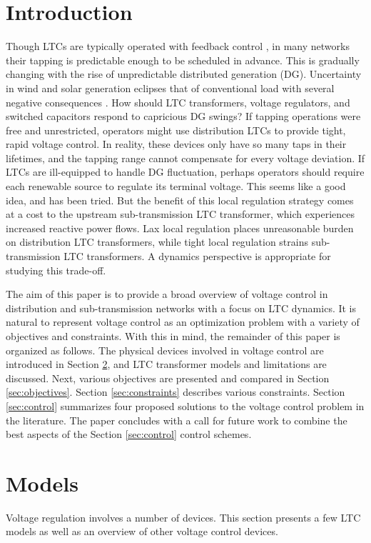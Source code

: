\documentclass[10pt,letterpaper]{article}
\begin{document}
\section{Introduction}
\label{sec:introduction}
Though LTCs are typically operated with feedback control \cite{baghsorkhi2015}, in many networks their tapping is predictable enough to be scheduled in advance. This is gradually changing with the rise of unpredictable distributed generation (DG). Uncertainty in wind and solar generation eclipses that of conventional load with several negative consequences \cite{walling2008}. How should LTC transformers, voltage regulators, and switched capacitors respond to capricious DG swings? If tapping operations were free and unrestricted, operators might use distribution LTCs to provide tight, rapid voltage control. In reality, these devices only have so many taps in their lifetimes, and the tapping range cannot compensate for every voltage deviation. If LTCs are ill-equipped to handle DG fluctuation, perhaps operators should require each renewable source to regulate its terminal voltage. This seems like a good idea, and has been tried. But the benefit of this local regulation strategy comes at a cost to the upstream sub-transmission LTC transformer, which experiences increased reactive power flows. Lax local regulation places unreasonable burden on distribution LTC transformers, while tight local regulation strains sub-transmission LTC transformers. A dynamics perspective is appropriate for studying this trade-off.

The aim of this paper is to provide a broad overview of voltage control in distribution and sub-transmission networks with a focus on LTC dynamics. It is natural to represent voltage control as an optimization problem with a variety of objectives and constraints. With this in mind, the remainder of this paper is organized as follows. The physical devices involved in voltage control are introduced in Section \ref{sec:models}, and LTC transformer models and limitations are discussed. Next, various objectives are presented and compared in Section \ref{sec:objectives}. Section \ref{sec:constraints} describes various constraints. Section \ref{sec:control} summarizes four proposed solutions to the voltage control problem in the literature. The paper concludes with a call for future work to combine the best aspects of the Section \ref{sec:control} control schemes.

\section{Models}
\label{sec:models}
Voltage regulation involves a number of devices. This section presents a few LTC models as well as an overview of other voltage control devices.
\end{document}
